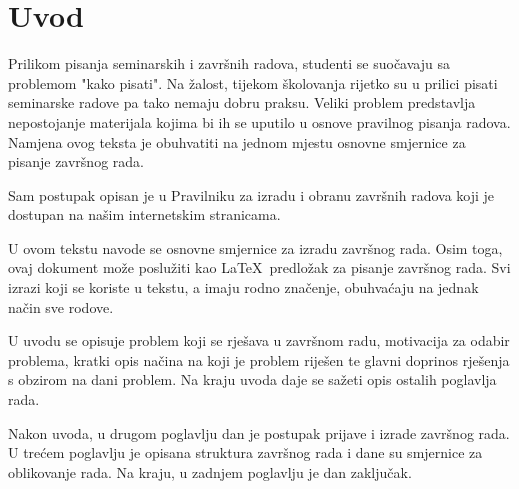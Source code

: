 \section{Uvod}
Prilikom pisanja seminarskih i završnih radova, studenti se suočavaju sa problemom "kako pisati". Na žalost, tijekom školovanja rijetko su u prilici pisati seminarske radove pa tako nemaju dobru praksu. Veliki problem predstavlja nepostojanje materijala kojima bi ih se uputilo u osnove pravilnog pisanja radova. Namjena ovog teksta 
je obuhvatiti na jednom 
mjestu osnovne smjernice za pisanje završnog rada.

Sam postupak opisan je u Pravilniku za izradu i obranu završnih radova koji je dostupan na našim internetskim stranicama.



U ovom tekstu navode se osnovne smjernice za izradu završnog rada. Osim toga, ovaj dokument može poslužiti kao \LaTeX \ predložak za pisanje završnog rada. Svi izrazi koji se koriste u tekstu, a imaju rodno značenje, obuhvaćaju na jednak način sve rodove. 

U uvodu se opisuje problem koji se rješava u završnom radu, motivacija za odabir problema, kratki opis načina na koji je problem riješen te glavni doprinos rješenja s obzirom na dani problem. Na kraju uvoda daje se sažeti opis ostalih poglavlja rada. 

Nakon uvoda, u drugom poglavlju dan je postupak prijave i izrade završnog rada. U trećem 
poglavlju je opisana struktura završnog rada i dane su smjernice za oblikovanje rada. Na kraju, u zadnjem poglavlju je dan zaključak.
